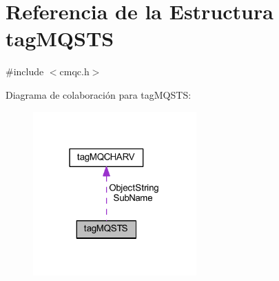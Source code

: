 \hypertarget{structtag_m_q_s_t_s}{}\section{Referencia de la Estructura tag\+M\+Q\+S\+T\+S}
\label{structtag_m_q_s_t_s}


{\ttfamily \#include $<$cmqc.\+h$>$}



Diagrama de colaboración para tag\+M\+Q\+S\+T\+S\+:\nopagebreak
\begin{figure}[H]
\begin{center}
\leavevmode
\includegraphics[width=178pt]{structtag_m_q_s_t_s__coll__graph}
\end{center}
\end{figure}
